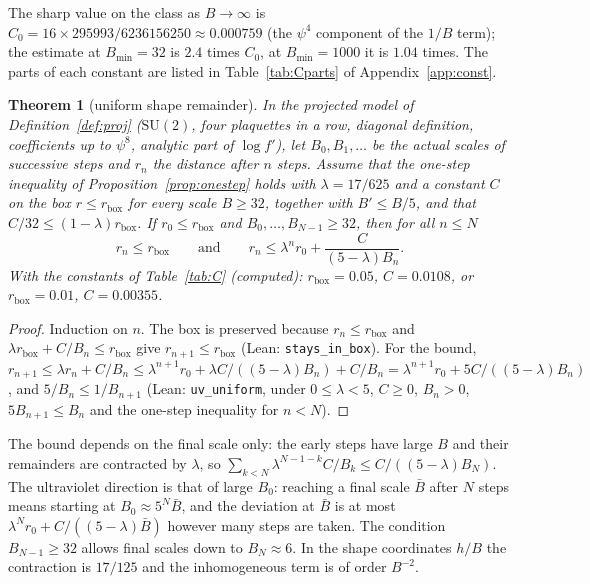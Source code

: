 \documentclass[11pt,a4paper]{article}
\newtheorem{theorem}{Theorem}
\theoremstyle{definition}
\theoremstyle{remark}
\newcommand{\SU}{\mathrm{SU}(2)}
\newcommand{\code}[1]{\texttt{#1}}
\begin{document}
The sharp value on the class as $B\to\infty$ is $C_0=16\times295993/6236156250\approx0.000759$ (the $\psi^4$ component of the $1/B$ term); the estimate at $B_{\min}=32$ is $2.4$ times $C_0$, at $B_{\min}=1000$ it is $1.04$ times. The parts of each constant are listed in Table~\ref{tab:Cparts} of Appendix~\ref{app:const}.

\begin{theorem}[uniform shape remainder]\label{thm:U}
In the projected model of Definition~\ref{def:proj} ($\SU$, four plaquettes in a row, diagonal definition, coefficients up to $\psi^8$, analytic part of $\log f'$), let $B_0,B_1,\dots$ be the actual scales of successive steps and $r_n$ the distance after $n$ steps.
Assume that the one-step inequality of Proposition~\ref{prop:onestep} holds with $\lambda=17/625$ and a constant $C$ on the box $r\le r_{\mathrm{box}}$ for every scale $B\ge32$, together with $B'\le B/5$, and that $C/32\le(1-\lambda)r_{\mathrm{box}}$.
If $r_0\le r_{\mathrm{box}}$ and $B_0,\dots,B_{N-1}\ge32$, then for all $n\le N$
\[
r_n\le r_{\mathrm{box}}\qquad\text{and}\qquad r_n\le\lambda^n r_0+\frac{C}{(5-\lambda)B_n}.
\]
With the constants of Table~\ref{tab:C} (computed): $r_{\mathrm{box}}=0.05$, $C=0.0108$, or $r_{\mathrm{box}}=0.01$, $C=0.00355$.
\end{theorem}

\begin{proof}
Induction on $n$.
The box is preserved because $r_n\le r_{\mathrm{box}}$ and $\lambda r_{\mathrm{box}}+C/B_n\le r_{\mathrm{box}}$ give $r_{n+1}\le r_{\mathrm{box}}$ (Lean: \code{stays\_in\_box}).
For the bound, $r_{n+1}\le\lambda r_n+C/B_n\le\lambda^{n+1}r_0+\lambda C/((5-\lambda)B_n)+C/B_n=\lambda^{n+1}r_0+5C/((5-\lambda)B_n)$, and $5/B_n\le1/B_{n+1}$ (Lean: \code{uv\_uniform}, under $0\le\lambda<5$, $C\ge0$, $B_n>0$, $5B_{n+1}\le B_n$ and the one-step inequality for $n<N$).
\end{proof}

The bound depends on the final scale only: the early steps have large $B$ and their remainders are contracted by $\lambda$, so $\sum_{k<N}\lambda^{N-1-k}C/B_k\le C/((5-\lambda)B_N)$.
The ultraviolet direction is that of large $B_0$: reaching a final scale $\bar B$ after $N$ steps means starting at $B_0\approx5^N\bar B$, and the deviation at $\bar B$ is at most $\lambda^Nr_0+C/((5-\lambda)\bar B)$ however many steps are taken.
The condition $B_{N-1}\ge32$ allows final scales down to $B_N\approx6$.
In the shape coordinates $h/B$ the contraction is $17/125$ and the inhomogeneous term is of order $B^{-2}$.
\end{document}
